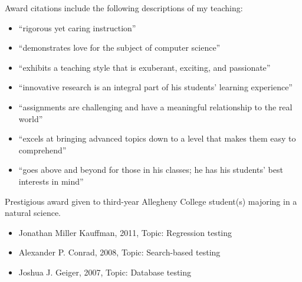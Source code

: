 \documentclass[11pt,letterpaper,sans]{moderncv}
\begin{document}
{Award citations include the following descriptions of my teaching: \vspace*{.025in}
  \begin{itemize}
    \renewcommand\labelitemi{\Large\textbullet}
    \item ``rigorous yet caring instruction''
    \item ``demonstrates love for the subject of computer science''
    \item ``exhibits a teaching style that is exuberant, exciting, and passionate''
    \item ``innovative research is an integral part of his students’ learning experience''
    \item ``assignments are challenging and have a meaningful relationship to the real world''
    \item ``excels at bringing advanced topics down to a level that makes them easy to comprehend''
    \item ``goes above and beyond for those in his classes; he has his students’ best interests in mind''
  \end{itemize}}


{Prestigious award given to third-year Allegheny College student(s) majoring in a natural science.\vspace*{.025in}
  \begin{itemize}
    \renewcommand\labelitemi{\Large\textbullet}
  \item Jonathan Miller Kauffman, 2011, Topic: Regression testing
  \item Alexander P. Conrad, 2008, Topic: Search-based testing
  \item Joshua J. Geiger, 2007, Topic: Database testing
\end{itemize}
\vspace*{.05in}
}

\end{document}
